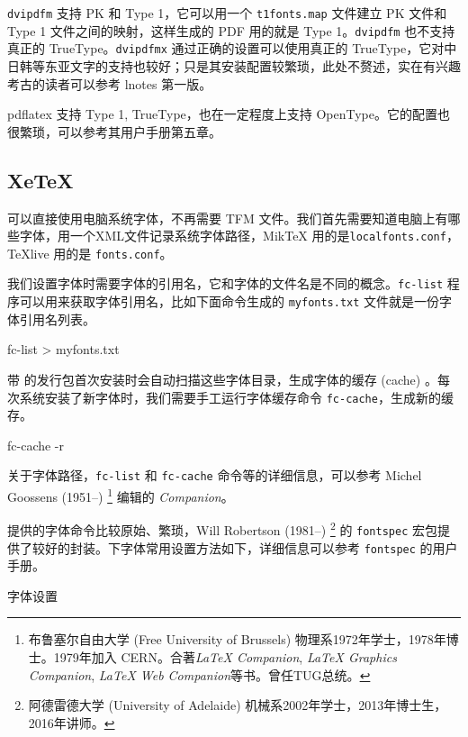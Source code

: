 \texttt{dvipdfm} 支持 PK 和 Type 1，它可以用一个 \texttt{t1fonts.map} 文件建立 PK 文件和 Type 1 文件之间的映射，这样生成的 PDF 用的就是 Type 1。\texttt{dvipdfm} 也不支持真正的 TrueType。\texttt{dvipdfmx} 通过正确的设置可以使用真正的 TrueType，它对中日韩等东亚文字的支持也较好；只是其安装配置较繁琐，此处不赘述，实在有兴趣考古的读者可以参考 lnotes 第一版\citep{Huang_lnotes}。

pdflatex 支持 Type 1, TrueType，也在一定程度上支持 OpenType。它的配置也很繁琐，可以参考其用户手册\citep{Han_pdftex}第五章。

\subsection{XeTeX}

\XeTeX 可以直接使用电脑系统字体，不再需要 TFM 文件。我们首先需要知道电脑上有哪些字体，\XeTeX 用一个XML文件记录系统字体路径，MikTeX 用的是\texttt{localfonts.conf}，TeXlive 用的是 \texttt{fonts.conf}。

我们设置字体时需要字体的引用名，它和字体的文件名是不同的概念。\texttt{fc-list} 程序可以用来获取字体引用名，比如下面命令生成的 \texttt{myfonts.txt} 文件就是一份字体引用名列表。

\begin{Code}[]
fc-list > myfonts.txt
\end{Code}

带 \XeTeX 的发行包首次安装时会自动扫描这些字体目录，生成字体的缓存 (cache) 。每次系统安装了新字体时，我们需要手工运行字体缓存命令 \texttt{fc-cache}，生成新的缓存。

\begin{Code}[]
fc-cache -r
\end{Code}

关于字体路径，\texttt{fc-list} 和 \texttt{fc-cache} 命令等的详细信息，可以参考 Michel Goossens (1951--)\indexGoossens{} \footnote{布鲁塞尔自由大学 (Free University of Brussels) 物理系1972年学士，1978年博士。1979年加入 CERN。合著\emph{\LaTeX{} Companion}, \emph{\LaTeX{} Graphics Companion}, \emph{\LaTeX{} Web Companion}等书。曾任TUG总统。} 编辑的\emph{\XeTeX{} Companion}\citep{Goossens_xetex}。

\XeTeX 提供的字体命令比较原始、繁琐，Will Robertson (1981--)\indexRobertson{} \footnote{阿德雷德大学 (University of Adelaide) 机械系2002年学士，2013年博士生，2016年讲师。} 的 \texttt{fontspec} 宏包提供了较好的封装。\XeLaTeX 下字体常用设置方法如下，详细信息可以参考 \texttt{fontspec} 的用户手册\citep{Robertson_fontspec}。

\begin{example}[h]
\begin{Code}[]
\usepackage{fontspec}
\setmainfont[Mapping=tex-text]{Times New Roman}
\setsansfont[Mapping=tex-text]{Tahoma}
\setmonofont{Courier New}
\end{Code}
\caption{\XeLaTeX 字体设置}
\label{exa:xelatex_font}
\end{example}

